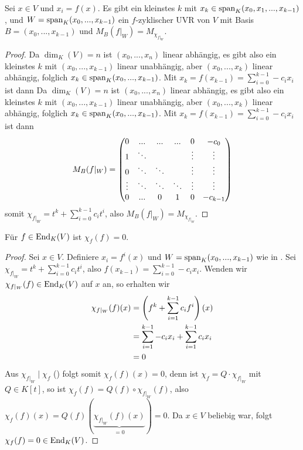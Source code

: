 \begin{lemma}
	Sei $x\in V$ und $x_i=f(x)$. Es gibt ein kleinstes $k$ mit $x_k\in\operatorname{span}_K(x_0,x_1,...,x_{k-1})$, und $W=\operatorname{span}_K(x_0,...,x_{k-1})$ ein $f$-zyklischer UVR von $V$ mit Basis $B=(x_0,...,x_{k-1})$ und $M_B(f\vert_W)=M_{\chi_{f\vert_W}}$.
\end{lemma}
\begin{proof}
	Da $\dim_K(V)=n$ ist $(x_0,...,x_n)$ linear abhängig, es gibt also ein kleinstes $k$ mit $(x_0,...,x_{k-1})$ linear unabhängig, aber $(x_0,...,x_k)$ linear abhängig, folglich $x_k\in\operatorname{span}_K(x_0,...,x_{k-1})$. Mit $x_k=f(x_{k-1})=\sum_{i=0}^{k-1}-c_ix_i$ ist dann 
	Da $\dim_K(V)=n$ ist $(x_0,...,x_n)$ linear abhängig, es gibt also ein kleinstes $k$ mit $(x_0,...,x_{k-1})$ linear unabhängig, aber $(x_0,...,x_k)$ linear abhängig, folglich $x_k\in\operatorname{span}_K(x_0,...,x_{k-1})$. Mit $x_k=f(x_{k-1})=\sum_{i=0}^{k-1}-c_ix_i$ ist dann 
	\begin{align}
		M_B(f\vert_W)=\begin{pmatrix}0&...&...&...&0&-c_0\\
		1&\ddots&\;&\;&\vdots&\vdots\\
		0&\ddots&\ddots&\;&\vdots&\vdots\\
		\vdots&\ddots&\ddots&\ddots&\vdots&\vdots\\
		0&...&0&1&0&-c_{k-1}\end{pmatrix}\notag
	\end{align}
	somit $\chi_{f\vert_W}=t^k+\sum_{i=0}^{k-1}c_it^i$, also $M_B(f\vert_W)=M_{\chi_{f\vert_W}}$.
\end{proof}

\begin{theorem}
	Für $f\in\operatorname{End}_K(V)$ ist $\chi_f(f)=0$.
\end{theorem}
\begin{proof}
	Sei $x\in V$. Definiere $x_i=f^i(x)$ und $W=\operatorname{span}_K(x_0,...,x_{k-1})$ wie in . Sei $\chi_{f\vert_W}=t^k+\sum_{i=0}^{k-1} c_it^i$, also $f(x_{k-1})=\sum_{i=0}^{k-1} -c_ix_i$. Wenden wir $\chi_{f\vert_W}(f)\in\operatorname{End}_K(V)$ auf $x$ an, so erhalten wir 
	\begin{align}
		\chi_{f\vert_W}(f)(x)&=\left( f^k+\sum\limits_{i=1}^{k-1} c_if^i\right)(x)\notag \\
		&= \sum\limits_{i=1}^{k-1} -c_ix_i+\sum\limits_{i=1}^{k-1}c_ix_i\notag \\
		&= 0\notag
	\end{align}
	Aus $\chi_{f\vert_W}\mid \chi_f$ () folgt somit $\chi_f(f)(x)=0$, denn ist $\chi_f=Q\cdot \chi_{f\vert_W}$ mit $Q\in K[t]$, so ist $\chi_f(f)=Q(f)\circ\chi_{f\vert_W}(f)$, also $\chi_f(f)(x)=Q(f)(\underbrace{\chi_{f\vert_W}(f)(x)}_{=0})=0$. Da $x\in V$ beliebig war, folgt $\chi_f(f)=0\in\operatorname{End}_K(V)$.
\end{proof}

